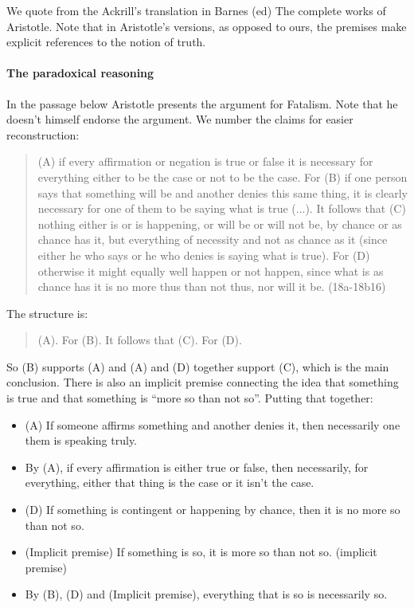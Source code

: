 \documentclass[../../../include/open-logic-section]{subfiles}
\begin{document}
We quote from the Ackrill's translation in Barnes (ed) The complete works of Aristotle. Note that in Aristotle's versions, as opposed to ours, the premises make explicit references to the notion of truth.

\paragraph*{The paradoxical reasoning}

In the passage below Aristotle presents the argument for Fatalism. Note that he doesn't himself endorse the argument. We number the claims for easier reconstruction:

\begin{quote}
	(A) if every affirmation or negation is true or false it is necessary for everything either to be the case or not to be the case. For (B) if one person says that something will be and another denies this same thing, it is clearly necessary for one of them to be saying what is true (...). It follows that (C) nothing either is or is happening, or will be or will not be, by chance or as chance has it, but everything of necessity and not as chance as it (since either he who says or he who denies is saying what is true). For (D) otherwise it might equally well happen or not happen, since what is as chance has it is no more thus than not thus, nor will it be. (18a-18b16)
\end{quote}

The structure is:

\begin{quote}
(A). For (B). It follows that (C). For (D). 
\end{quote}

So (B) supports (A) and (A) and (D) together support (C), which is the main conclusion. There is also an implicit premise connecting the idea that something is true and that something is ``more so than not so''. Putting that together:

\begin{itemize}
	\item (A) If someone affirms something and another denies it, then necessarily one them is speaking truly.
	\item By (A), if every affirmation is either true or false, then necessarily, for everything, either that thing is the case or it isn't the case.
	\item (D) If something is contingent or happening by chance, then it is no more so than not so. 
	\item (Implicit premise) If something is so, it is more so than not so. (implicit premise)
	\item By (B), (D) and (Implicit premise), everything that is so is necessarily so.
\end{itemize}
\end{document}
